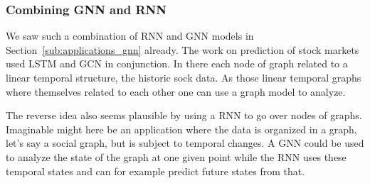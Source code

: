 \documentclass{article}
\begin{document}
\subsubsection{Combining GNN and RNN}
We saw such a combination of RNN and GNN models in Section~\ref{sub:applications_gnn} already. The work on prediction of stock markets used LSTM and GCN in conjunction.
In there each node of graph related to a linear temporal structure, the historic sock data.
As those linear temporal graphs where themselves related to each other one can use a graph model to analyze.

The reverse idea also seems plausible by using a RNN to go over nodes of graphs.
Imaginable might here be an application where the data is organized in a graph, let's say a social graph, but is subject to temporal changes.
A GNN could be used to analyze the state of the graph at one given point while the RNN uses these temporal states and can for example predict future states from that.



\end{document}
